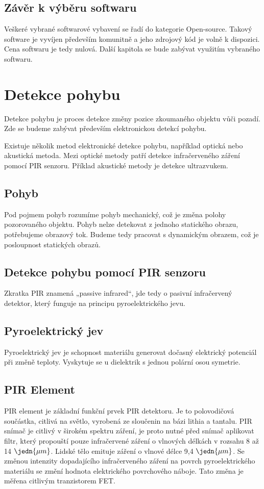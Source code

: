 \subsection*{Závěr k výběru softwaru}
Veškeré vybrané softwarové vybavení se řadí do kategorie Open-source. Takový software je vyvíjen především komunitně a jeho zdrojový kód je volně k dispozici. Cena softwaru je tedy nulová.
Další kapitola se bude zabývat využitím vybraného softwaru.

\section{Detekce pohybu}
Detekce pohybu je proces detekce změny pozice zkoumaného objektu vůči pozadí. Zde se budeme zabývat především elektronickou detekcí pohybu.

Existuje několik metod elektronické detekce pohybu, například optická nebo akustická metoda. Mezi optické metody patří detekce infračerveného záření pomocí PIR senzoru. Příklad akustické metody je detekce ultrazvukem.

\subsection*{Pohyb}
Pod pojmem pohyb rozumíme pohyb mechanický, což je změna polohy pozorovaného objektu.
Pohyb nelze detekovat z jednoho statického obrazu, potřebujeme obrazový tok.
Budeme tedy pracovat s dynamickým obrazem, což je posloupnost statických obrazů.

\subsection*{Detekce pohybu pomocí PIR senzoru}
Zkratka PIR znamená „passive infrared“, jde tedy o pasivní infračervený detektor, který funguje na principu pyroelektrického jevu.

\subsection*{Pyroelektrický jev}
Pyroelektrický jev je schopnost materiálu generovat dočasný elektrický potenciál při změně teploty. Vyskytuje se u dielektrik s jednou polární osou symetrie.

\subsection*{PIR Element}
PIR element je základní funkční prvek PIR detektoru. Je to polovodičová součástka, citlivá na světlo, vyrobená ze sloučenin na bázi lithia a tantalu. PIR snímač je citlivý v širokém spektru záření, je proto nutné před snímač aplikovat filtr, který propouští pouze infračervené záření o vlnových délkách v rozsahu 8 až 14 $\jedn{\mu m}$. Lidské tělo emituje záření o vlnové délce 9,4 $\jedn{\mu m}$. Se změnou intenzity dopadajícího infračerveného záření na povrch pyroelektrického materiálu se změní hodnota elektrického povrchového náboje. Tato změna je měřena citlivým tranzistorem FET. \cite{pir_senzor}

